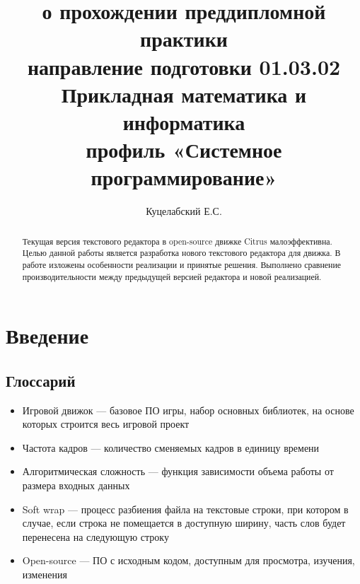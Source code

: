 \documentclass{fefu}
\begin{document}
	\title{о прохождении преддипломной практики\\направление подготовки 01.03.02 
	Прикладная математика и информатика\\профиль «Системное программирование»}
	\author{Куцелабский Е.С.}
	
	\makereporttitle
	\maketableofcontents
	\newpage
	
	\begin{abstract}
		\par Текущая версия текстового редактора в open-source движке Citrus малоэффективна.
		Целью данной работы является разработка нового текстового редактора для 
		движка. В работе изложены особенности реализации и принятые решения.
		Выполнено сравнение производительности между предыдущей версией редактора и
		новой реализацией.
	\end{abstract}

	\section{Введение}
		\subsection{Глоссарий}
			\begin{itemize}
				\item Игровой движок --- базовое ПО игры, набор основных библиотек, на основе
				которых строится весь игровой проект
				\item Частота кадров --- количество сменяемых кадров в единицу времени
				\item Алгоритмическая сложность --- функция зависимости объема работы от 
				размера входных данных
				\item Soft wrap --- процесс разбиения файла на текстовые строки, при котором
				в случае, если строка не помещается в доступную ширину, часть слов будет
				перенесена на следующую строку
				\item Open-source --- ПО с исходным кодом, доступным для просмотра, изучения, 
				изменения
			\end{itemize}
\end{document}
